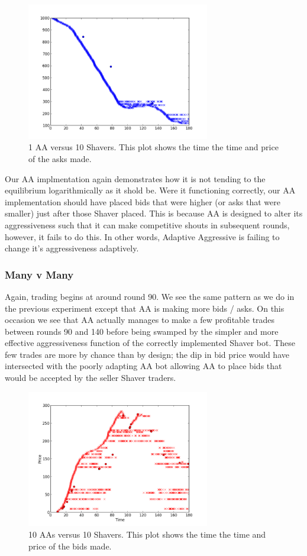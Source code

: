 \documentclass{acm_proc_article-sp}
\begin{document}
\begin{figure}[h!] \includegraphics[width=80mm]{SHVR10AA1_180_all_asks.png}
\caption {1 AA versus 10 Shavers. This plot shows the time the time and price of the asks made.}
\end{figure}

Our AA implmentation again demonstrates how it is not tending to the
equilibrium logarithmically as it shold be. Were it functioning correctly, our
AA implementation should have placed bids that were higher (or asks that were
smaller) just after those Shaver placed. This is because AA is designed to
alter its aggressiveness such that it can make competitive shouts in subsequent
rounds, however, it fails to do this. In other words, Adaptive Aggressive is
failing to change it's aggressiveness adaptively.

\subsubsection{Many v Many} Again, trading begins at around round 90. We see
the same pattern as we do in the previous experiment except that AA is making
more bids / asks. On this occasion we see that AA actually manages to make a
few profitable trades between rounds 90 and 140 before being swamped by the
simpler and more effective aggressiveness function of the correctly implemented
Shaver bot. These few trades are more by chance than by design; the dip in bid
price would have intersected with the poorly adapting AA bot allowing AA to
place bids that would be accepted by the seller Shaver traders.

\begin{figure}[h!] \includegraphics[width=80mm]{SHVR10AA10_180_all_bids.png}
\caption {10 AAs versus 10 Shavers. This plot shows the time the time and price of the bids made.}
\end{figure}
\end{document}

